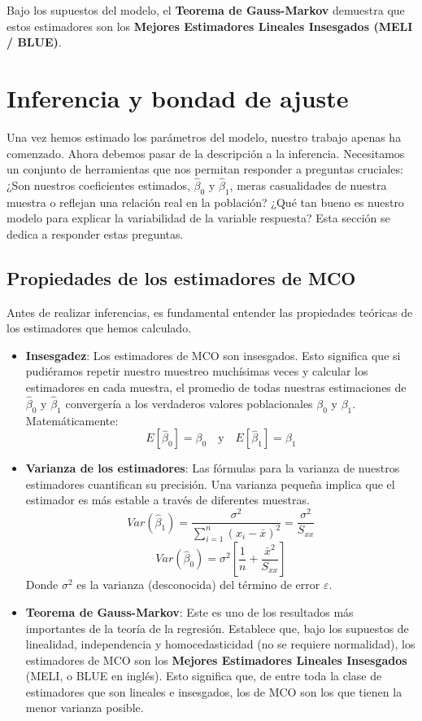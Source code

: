 \documentclass[
  letterpaper,
  DIV=11,
  numbers=noendperiod]{scrreprt}
\begin{document}
Bajo los supuestos del modelo, el \textbf{Teorema de Gauss-Markov}
demuestra que estos estimadores son los \textbf{Mejores Estimadores
Lineales Insesgados (MELI / BLUE)}.

\section{Inferencia y bondad de
ajuste}\label{inferencia-y-bondad-de-ajuste}

Una vez hemos estimado los parámetros del modelo, nuestro trabajo apenas
ha comenzado. Ahora debemos pasar de la descripción a la inferencia.
Necesitamos un conjunto de herramientas que nos permitan responder a
preguntas cruciales: ¿Son nuestros coeficientes estimados,
\(\hat{\beta}_0\) y \(\hat{\beta}_1\), meras casualidades de nuestra
muestra o reflejan una relación real en la población? ¿Qué tan bueno es
nuestro modelo para explicar la variabilidad de la variable respuesta?
Esta sección se dedica a responder estas preguntas.

\subsection{Propiedades de los estimadores de
MCO}\label{propiedades-de-los-estimadores-de-mco}

Antes de realizar inferencias, es fundamental entender las propiedades
teóricas de los estimadores que hemos calculado.

\begin{itemize}
\item
  \textbf{Insesgadez}: Los estimadores de MCO son insesgados. Esto
  significa que si pudiéramos repetir nuestro muestreo muchísimas veces
  y calcular los estimadores en cada muestra, el promedio de todas
  nuestras estimaciones de \(\hat{\beta}_0\) y \(\hat{\beta}_1\)
  convergería a los verdaderos valores poblacionales \(\beta_0\) y
  \(\beta_1\). Matemáticamente: \[
    E[\hat{\beta}_0] = \beta_0 \quad \text{y} \quad E[\hat{\beta}_1] = \beta_1
    \]
\item
  \textbf{Varianza de los estimadores}: Las fórmulas para la varianza de
  nuestros estimadores cuantifican su precisión. Una varianza pequeña
  implica que el estimador es más estable a través de diferentes
  muestras. \[
    Var(\hat{\beta}_1) = \frac{\sigma^2}{\sum_{i=1}^{n}(x_i - \bar{x})^2} = \frac{\sigma^2}{S_{xx}}
    \] \[
    Var(\hat{\beta}_0) = \sigma^2 \left[ \frac{1}{n} + \frac{\bar{x}^2}{S_{xx}} \right]
    \] Donde \(\sigma^2\) es la varianza (desconocida) del término de
  error \(\varepsilon\).
\item
  \textbf{Teorema de Gauss-Markov}: Este es uno de los resultados más
  importantes de la teoría de la regresión. Establece que, bajo los
  supuestos de linealidad, independencia y homocedasticidad (no se
  requiere normalidad), los estimadores de MCO son los \textbf{Mejores
  Estimadores Lineales Insesgados} (MELI, o BLUE en inglés). Esto
  significa que, de entre toda la clase de estimadores que son lineales
  e insesgados, los de MCO son los que tienen la menor varianza posible.
\end{itemize}
\end{document}
